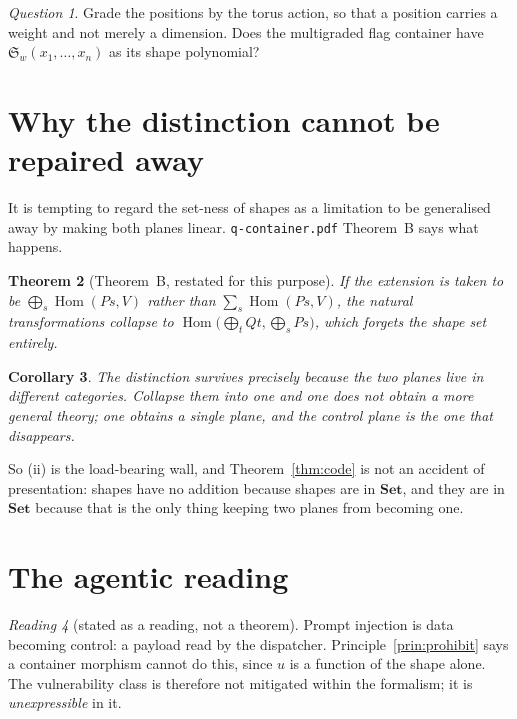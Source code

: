 \documentclass[11pt,a4paper]{article}
\newtheorem{theorem}{Theorem}[section]
\newtheorem{corollary}[theorem]{Corollary}
\theoremstyle{definition}
\theoremstyle{remark}
\newtheorem{reading}[theorem]{Reading}
\newtheorem{question}[theorem]{Question}
\newcommand{\cat}[1]{\mathbf{#1}}
\newcommand{\Set}{\cat{Set}}
\DeclareMathOperator{\Hom}{Hom}
\newcommand{\Schub}{\mathfrak{S}}
\begin{document}
\begin{question}
Grade the positions by the torus action, so that a position carries a weight and
not merely a dimension. Does the multigraded flag container have
$\Schub_w(x_1,\ldots,x_n)$ as its shape polynomial?
\end{question}

\section{Why the distinction cannot be repaired away}

It is tempting to regard the set-ness of shapes as a limitation to be generalised
away by making both planes linear. \texttt{q-container.pdf} Theorem~B says what
happens.

\begin{theorem}[Theorem~B, restated for this purpose]
If the extension is taken to be $\bigoplus_s \Hom(P s, V)$ rather than
$\sum_s \Hom(P s, V)$, the natural transformations collapse to
$\Hom\bigl(\bigoplus_t Q t, \bigoplus_s P s\bigr)$, which forgets the shape set
entirely.
\end{theorem}

\begin{corollary}\label{cor:wall}
The distinction survives precisely because the two planes live in different
categories. Collapse them into one and one does not obtain a more general theory;
one obtains a single plane, and the control plane is the one that disappears.
\end{corollary}

So (ii) is the load-bearing wall, and Theorem~\ref{thm:code} is not an accident of
presentation: shapes have no addition because shapes are in $\Set$, and they are
in $\Set$ because that is the only thing keeping two planes from becoming one.

\section{The agentic reading}

\begin{reading}[stated as a reading, not a theorem]
Prompt injection is data becoming control: a payload read by the dispatcher.
Principle~\ref{prin:prohibit} says a container morphism cannot do this, since $u$
is a function of the shape alone. The vulnerability class is therefore not
mitigated within the formalism; it is \emph{unexpressible} in it.
\end{reading}
\end{document}
